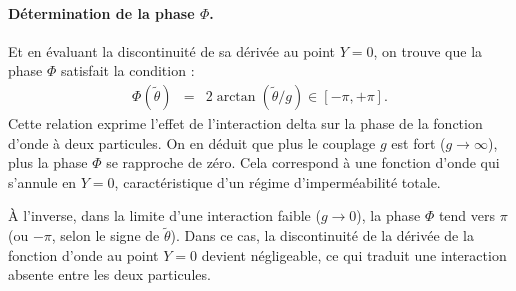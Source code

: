 \paragraph{Détermination de la phase $\Phi$.}
Et en évaluant la discontinuité de sa dérivée au point $Y = 0$, on trouve que la phase $\Phi$ satisfait la condition :
\begin{eqnarray}\label{chap:1:dif.mod.2.part.2}
	\Phi(\tilde{\theta}) & = & 2 \arctan (\tilde{\theta}/g) \in [ - \pi , +\pi ].
\end{eqnarray}
Cette relation exprime l’effet de l’interaction delta sur la phase de la fonction d’onde à deux particules. On en déduit que plus le couplage \( g \) est fort (\( g \to \infty \)), plus la phase \( \Phi \) se rapproche de zéro. Cela correspond à une fonction d’onde qui s’annule en \( Y = 0 \), caractéristique d’un régime d’imperméabilité totale.

À l’inverse, dans la limite d’une interaction faible (\( g \to 0 \)), la phase \( \Phi \) tend vers \( \pi \) (ou \( -\pi \), selon le signe de \( \tilde{\theta} \)). Dans ce cas, la discontinuité de la dérivée de la fonction d’onde au point \( Y = 0 \) devient négligeable, ce qui traduit une interaction absente entre les deux particules.




